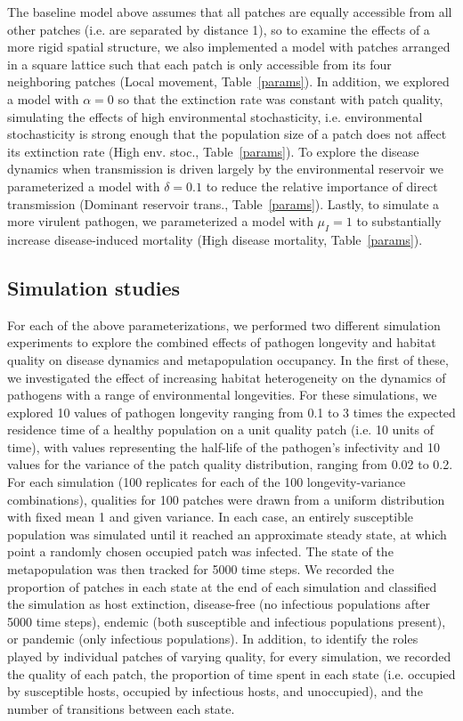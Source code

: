 \documentclass{svjour3}
\begin{document}
The baseline model above assumes that all patches are equally accessible from all other patches (i.e. are separated by distance 1), so to examine the effects of a more rigid spatial structure, we also implemented a model with patches arranged in a square lattice such that each patch is only accessible from its four neighboring patches (Local movement, Table~\ref{params}).  In addition, we explored a model with $\alpha = 0$ so that the extinction rate was constant with patch quality, simulating the effects of high environmental stochasticity, i.e. environmental stochasticity is strong enough that the population size of a patch does not affect its extinction rate (High env. stoc., Table~\ref{params}).  To explore the disease dynamics when transmission is driven largely by the environmental reservoir we parameterized a model with $\delta = 0.1$ to reduce the relative importance of direct transmission (Dominant reservoir trans., Table~\ref{params}).  Lastly, to simulate a more virulent pathogen, we parameterized a model with $\mu_I = 1$ to substantially increase disease-induced mortality (High disease mortality, Table~\ref{params}).

\subsection{Simulation studies}

For each of the above parameterizations, we performed two different simulation experiments to explore the combined effects of pathogen longevity and habitat quality on disease dynamics and metapopulation occupancy.  In the first of these, we investigated the effect of increasing habitat heterogeneity on the dynamics of pathogens with a range of environmental longevities.  For these simulations, we explored 10 values of pathogen longevity ranging from 0.1 to 3 times the expected residence time of a healthy population on a unit quality patch (i.e. 10 units of time), with values representing the half-life of the pathogen's infectivity and 10 values for the variance of the patch quality distribution, ranging from 0.02 to 0.2.  For each simulation (100 replicates for each of the 100 longevity-variance combinations), qualities for 100 patches were drawn from a uniform distribution with fixed mean 1 and given variance. In each case, an entirely susceptible population was simulated until it reached an approximate steady state, at which point a randomly chosen occupied patch was infected.  The state of the metapopulation was then tracked for 5000 time steps.  We recorded the proportion of patches in each state at the end of each simulation and classified the simulation as host extinction, disease-free (no infectious populations after 5000 time steps), endemic (both susceptible and infectious populations present), or pandemic (only infectious populations).  In addition, to identify the roles played by individual patches of varying quality, for every simulation, we recorded the quality of each patch, the proportion of time spent in each state (i.e. occupied by susceptible hosts, occupied by infectious hosts, and unoccupied), and the number of transitions between each state.  
\end{document}
